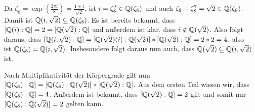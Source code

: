 \begin{exercisePage}
	Da $\zeta_8 = \exp \left( \frac{2\pi i}{8} \right) = \frac{1 + i}{\sqrt{2}}$, ist $i = \zeta_8^2 \in \mathbb{Q}(\zeta_8)$ und auch $\zeta_8 + \zeta_8^7 = \sqrt{2} \in \mathbb{Q}(\zeta_8)$. Damit ist $\mathbb{Q}(i, \sqrt{2}) \subseteq \mathbb{Q}(\zeta_8)$. Es ist bereits bekannt, dass $[\mathbb{Q}(i) : \mathbb{Q}] = 2 = [\mathbb{Q}(\sqrt{2}) : \mathbb{Q}]$ und außerdem ist klar, dass $i \notin \mathbb{Q}(\sqrt{2})$. Also folgt daraus, dass $[\mathbb{Q}(i,\sqrt{2}) : \mathbb{Q}] = [\mathbb{Q}(\sqrt{2})(i) : \mathbb{Q}(\sqrt{2})] * [\mathbb{Q}(\sqrt{2}) : \mathbb{Q}] = 2*2 = 4$, also ist $\mathbb{Q}(\zeta_8) = \mathbb{Q}(i,\sqrt{2})$. Insbesondere folgt daraus nun auch, dass $\mathbb{Q}(\sqrt{2}) \subseteq \mathbb{Q}(i,\sqrt{2})$ ist. 
	
	Nach Multiplikativität der Körpergrade gilt nun $[\mathbb{Q}(\zeta_8) : \mathbb{Q}] = [\mathbb{Q}(\zeta_8) : \mathbb{Q}(\sqrt{2})] * [\mathbb{Q}(\sqrt{2}) : \mathbb{Q}]$. Aus dem ersten Teil wissen wir, dass $[\mathbb{Q}(\zeta_8) : \mathbb{Q}]
	= 4$. Außerdem ist bekannt, dass $[\mathbb{Q}(\sqrt{2}) : \mathbb{Q}] = 2$ gilt und somit nur $[\mathbb{Q}(\zeta_8) : \mathbb{Q}(\sqrt{2})] = 2$ gelten kann.
	\end{exercisePage}